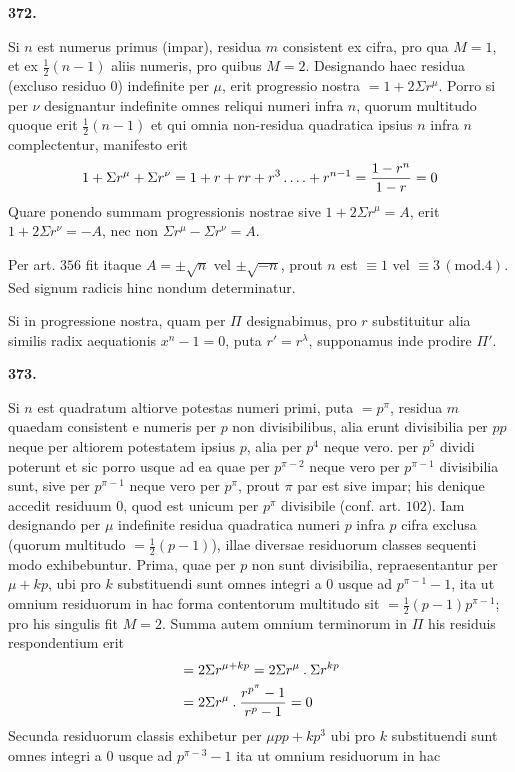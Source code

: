 \par\medskip{}\centerline{\textbf{372.}}\nobreak\smallskip
Si $n$ est numerus primus (impar), residua $m$ consistent ex cifra, pro qua $M=1$, et ex $\frac12(n-1)$ aliis numeris, pro quibus $M=2$. Designando haec residua (excluso residuo $0$) indefinite per $\mu$, erit progressio nostra $=1+2\Sigma r^\mu$. Porro si per $\nu$ designantur indefinite omnes reliqui numeri infra $n$, quorum multitudo quoque erit $\frac12(n-1)$ et qui omnia non-residua quadratica ipsius $n$ infra $n$ complectentur, manifesto erit
\[
1+\Sigma r^\mu+\Sigma r^\nu=1+r+rr+r^3\mathinner{.\,.\,.\,.}+r^{n-1}=\frac{1-r^n}{1-r}=0
\]
Quare ponendo summam progressionis nostrae sive $1+2\Sigma r^\mu=A$, erit $1+2\Sigma r^\nu=-A$, nec non $\Sigma r^\mu-\Sigma r^\nu=A$.
\par Per art. $356$ fit itaque $A=\pm\surd n$ vel $\pm\surd{-n}$, prout $n$ est $\equiv1$ vel $\equiv3\, (\mathrm{mod}.4)$. Sed signum radicis hinc nondum determinatur.
\par Si in progressione nostra, quam per $\Pi$ designabimus, pro $r$ substituitur alia similis radix aequationis $x^n-1=0$, puta $r'=r^\lambda$, supponamus inde prodire $\Pi'$.
\par\medskip{}\centerline{\textbf{373.}}\nobreak\smallskip
Si $n$ est quadratum altiorve potestas numeri primi, puta $=p^\pi$, residua $m$ quaedam consistent e numeris per $p$ non divisibilibus, alia erunt divisibilia per $pp$ neque per altiorem potestatem ipsius $p$, alia per $p^4$ neque vero. per $p^5$ dividi poterunt et sic porro usque ad ea quae per $p^{\pi-2}$ neque vero per $p^{\pi-1}$ divisibilia sunt, sive per $p^{\pi-1}$ neque vero per $p^\pi$, prout $\pi$ par est sive impar; his denique accedit residuum $0$, quod est unicum per $p^\pi$ divisibile (conf. art. $102$). Iam designando per $\mu$ indefinite residua quadratica numeri $p$ infra $p$ cifra exclusa (quorum multitudo $=\frac12(p-1)$), illae diversae residuorum classes sequenti modo exhibebuntur. Prima, quae per $p$ non sunt divisibilia, repraesentantur per $\mu+kp$, ubi pro $k$ substituendi sunt omnes integri a $0$ usque ad $p^{\pi-1}-1$, ita ut omnium residuorum in hac forma contentorum multitudo sit $=\frac12(p-1)p^{\pi-1}$; pro his singulis fit $M=2$. Summa autem omnium terminorum in $\Pi$ his residuis respondentium erit
\[
\begin{aligned}
&=2\Sigma r^{\mu+kp}=2\Sigma r^\mu\mathbin{.}\Sigma r^{kp}\\
&=2\Sigma r^\mu\mathbin{.}\frac{r^{p^\pi}-1}{r^p-1}=0
\end{aligned}
\]
Secunda residuorum classis exhibetur per $\mu pp+kp^3$ ubi pro $k$ substituendi sunt omnes integri a $0$ usque ad $p^{\pi-3}-1$ ita ut omnium residuorum in hac

